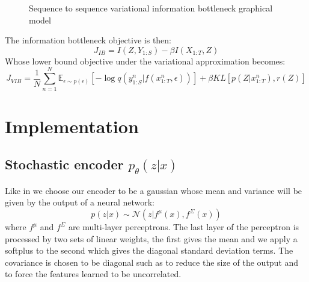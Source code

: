 \documentclass[10pt,oneside,openright]{report}
\begin{document}
\begin{figure}[H]
\centering
{}
\caption{Sequence to sequence variational information bottleneck graphical model}
\end{figure}

The information bottleneck objective is then:
$$ J_{IB} = I(Z, Y_{1:S}) - \beta I(X_{1:T}, Z)$$
Whose lower bound objective under the variational approximation becomes:
 $$ J_{VIB} = \frac{1}{N}  \sum_{n=1}^{N} \mathbb{E}_{\epsilon \sim p(\epsilon)}[- \log q(y_{1:S}^n |f(x_{1:T}^n, \epsilon))] + \beta KL[p(Z|x_{1:T}^n), r(Z)]$$

\chapter{Implementation}
\section{Stochastic encoder $p_\theta(z|x)$}
Like in \cite{vib} we choose our encoder to be a gaussian whose mean and variance will be given by the output of a neural network:
$$ p(z|x) \sim \mathcal{N}(z | f^\mu(x), f^\Sigma(x))$$ where $f^\mu$ and $f^\Sigma$ are multi-layer perceptrons. The last layer of the perceptron is processed by two sets of linear weights, the first gives the mean and we apply a softplus to the second which gives the diagonal standard deviation terms. The covariance is chosen to be diagonal such as to reduce the size of the output and to force the features learned to be uncorrelated.
\end{document}
